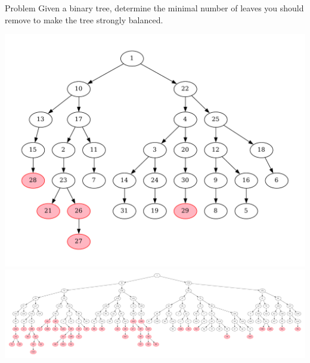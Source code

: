 \begin{frame}
    \frametitle{\problemtitle}
	\begin{block}{Problem}
        Given a binary tree, determine the minimal number of leaves you should remove to make the tree strongly balanced.
    \end{block}

    \vspace{-0.2cm}
    \begin{overprint}
		\centering
		\includegraphics[height=0.65\textheight]{./visuals/1}
		\onslide<2-3>
		\centering
		\includegraphics[height=0.65\textheight]{./visuals/2}
	\end{overprint}
    \pause
	\solvestats
\end{frame}
